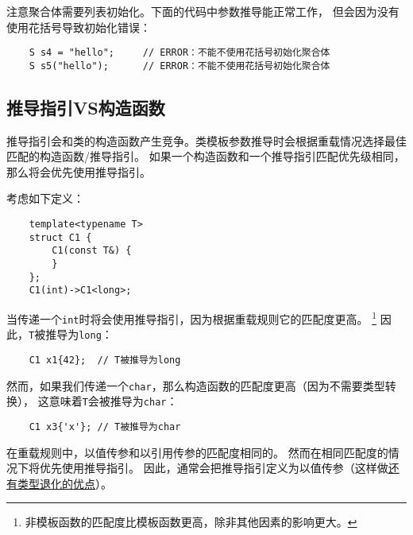 注意聚合体需要列表初始化。下面的代码中参数推导能正常工作，
但会因为没有使用花括号导致初始化错误：
\begin{lstlisting}
    S s4 = "hello";     // ERROR：不能不使用花括号初始化聚合体
    S s5("hello");      // ERROR：不能不使用花括号初始化聚合体
\end{lstlisting}

\subsection{推导指引VS构造函数}
推导指引会和类的构造函数产生竞争。类模板参数推导时会根据重载情况选择最佳匹配的构造函数/推导指引。
如果一个构造函数和一个推导指引匹配优先级相同，那么将会优先使用推导指引。

考虑如下定义：
\begin{lstlisting}
    template<typename T>
    struct C1 {
        C1(const T&) {
        }
    };
    C1(int)->C1<long>;
\end{lstlisting}
当传递一个\texttt{int}时将会使用推导指引，因为根据重载规则它的匹配度更高。
\footnote{非模板函数的匹配度比模板函数更高，除非其他因素的影响更大。}
因此，\texttt{T}被推导为\texttt{long}：
\begin{lstlisting}
    C1 x1{42};  // T被推导为long
\end{lstlisting}
然而，如果我们传递一个\texttt{char}，那么构造函数的匹配度更高（因为不需要类型转换），
这意味着\texttt{T}会被推导为\texttt{char}：
\begin{lstlisting}
    C1 x3{'x'}; // T被推导为char
\end{lstlisting}
在重载规则中，以值传参和以引用传参的匹配度相同的。
然而在相同匹配度的情况下将优先使用推导指引。
因此，通常会把推导指引定义为以值传参（这样做\hyperref[ch9.2.1]{还有类型退化的优点}）。

